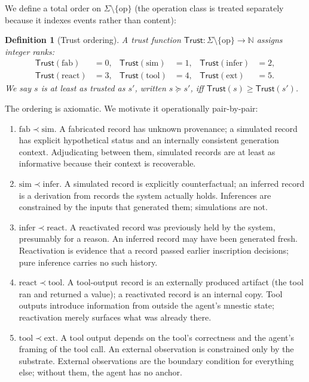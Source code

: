 \documentclass[11pt]{article}
\newtheorem{definition}{Definition}
\newcommand{\Trust}{\mathsf{Trust}}
\newcommand{\SourceSet}{\Sigma}
\newcommand{\ext}{\ensuremath{\mathrm{ext}}}
\newcommand{\tool}{\ensuremath{\mathrm{tool}}}
\newcommand{\react}{\ensuremath{\mathrm{react}}}
\newcommand{\infer}{\ensuremath{\mathrm{infer}}}
\newcommand{\simsrc}{\ensuremath{\mathrm{sim}}}
\newcommand{\fab}{\ensuremath{\mathrm{fab}}}
\newcommand{\op}{\ensuremath{\mathrm{op}}}
\begin{document}
We define a total order on $\SourceSet \setminus \{\op\}$ (the operation class is treated separately because it indexes events rather than content):

\begin{definition}[Trust ordering]
\label{def:trust}
A trust function $\Trust: \SourceSet \setminus \{\op\} \to \mathbb{N}$ assigns integer ranks:
\[
\begin{aligned}
\Trust(\fab)&=0, & \Trust(\simsrc)&=1, & \Trust(\infer)&=2,\\
\Trust(\react)&=3, & \Trust(\tool)&=4, & \Trust(\ext)&=5.
\end{aligned}
\]
We say $s$ is at least as trusted as $s'$, written $s \succeq s'$, iff $\Trust(s) \geq \Trust(s')$.
\end{definition}

The ordering is axiomatic. We motivate it operationally pair-by-pair:

\begin{enumerate}
\item $\fab \prec \simsrc$. A fabricated record has unknown provenance; a simulated record has explicit hypothetical status and an internally consistent generation context. Adjudicating between them, simulated records are at least as informative because their context is recoverable.

\item $\simsrc \prec \infer$. A simulated record is explicitly counterfactual; an inferred record is a derivation from records the system actually holds. Inferences are constrained by the inputs that generated them; simulations are not.

\item $\infer \prec \react$. A reactivated record was previously held by the system, presumably for a reason. An inferred record may have been generated fresh. Reactivation is evidence that a record passed earlier inscription decisions; pure inference carries no such history.

\item $\react \prec \tool$. A tool-output record is an externally produced artifact (the tool ran and returned a value); a reactivated record is an internal copy. Tool outputs introduce information from outside the agent's mnestic state; reactivation merely surfaces what was already there.

\item $\tool \prec \ext$. A tool output depends on the tool's correctness and the agent's framing of the tool call. An external observation is constrained only by the substrate. External observations are the boundary condition for everything else; without them, the agent has no anchor.
\end{enumerate}
\end{document}

